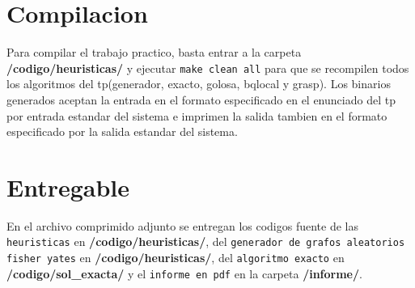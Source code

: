 \section{Compilacion}
Para compilar el trabajo practico, basta entrar a la carpeta \textbf{/codigo/heuristicas/} y ejecutar \texttt{make clean all} para que se recompilen todos los algoritmos del tp(generador, exacto, golosa, bqlocal y grasp). Los binarios generados aceptan la entrada en el formato especificado en el enunciado del tp por entrada estandar del sistema e imprimen la salida tambien en el formato especificado por la salida estandar del sistema.

\section{Entregable}
En el archivo comprimido adjunto se entregan los codigos fuente de las \texttt{heuristicas} en \textbf{/codigo/heuristicas/}, del \texttt{generador de grafos aleatorios fisher yates} en \textbf{/codigo/heuristicas/}, del \texttt{algoritmo exacto} en \textbf{/codigo/sol\_exacta/} y el \texttt{informe en pdf} en la carpeta \textbf{/informe/}.